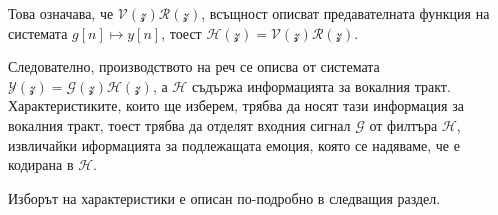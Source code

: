 \documentclass[main.tex]{subfiles}
\begin{document}
Това означава, че $\mathcal{V}(\mathcal{z})\mathcal{R}(\mathcal{z})$, всъщност описват предавателната функция на системата $g[n] \mapsto y[n]$, тоест $\mathcal{H}(\mathcal{z}
) = \mathcal{V}(\mathcal{z})\mathcal{R}(\mathcal{z})$.

Следователно, производството на реч се описва от системата $\mathcal{Y}(\mathcal{z}) = \mathcal{G}(\mathcal{z})\mathcal{H}(\mathcal{z})$,
а $\mathcal{H}$ съдържа информацията за вокалния тракт.
Характеристиките, които ще изберем, трябва да носят тази информация за вокалния тракт,
тоест трябва да отделят входния сигнал $\mathcal{G}$ от филтъра $\mathcal{H}$, извличайки иформацията
за подлежащата емоция, която се надяваме, че е кодирана в $\mathcal{H}$.

Изборът на характеристики е описан по-подробно в следващия раздел.
\end{document}
